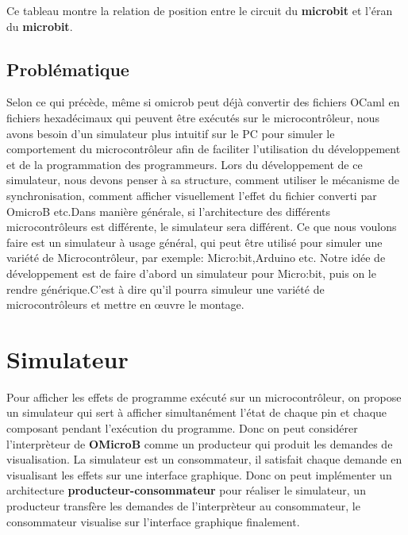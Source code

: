 \documentclass[14px]{article}
\begin{document}
Ce tableau montre la relation de position entre le circuit du  \textbf{microbit} et l'éran du \textbf{microbit}.

\begin{figure}

\end{figure}

\clearpage
\subsection{Problématique}
Selon ce qui précède, même si omicrob peut déjà convertir des fichiers OCaml en fichiers hexadécimaux qui peuvent être exécutés sur le microcontrôleur, nous avons besoin d'un simulateur plus intuitif sur le PC pour simuler le comportement du microcontrôleur afin de faciliter l'utilisation du développement et de la programmation des programmeurs. Lors du développement de ce simulateur, nous devons penser à sa structure, comment utiliser le mécanisme de synchronisation, comment afficher visuellement l'effet du fichier converti par OmicroB etc.Dans manière générale, si l'architecture des différents microcontrôleurs est différente, le simulateur sera différent. Ce que nous voulons faire est un simulateur à usage général, qui peut être utilisé pour simuler une variété de Microcontrôleur, par exemple: Micro:bit,Arduino etc. Notre idée de développement est de faire d'abord un simulateur pour Micro:bit, puis on le rendre générique.C'est à dire qu'il pourra simuleur une variété de microcontrôleurs et mettre en œuvre le montage.

\clearpage
\pagestyle{fancy}
\rhead{\thepage}
\fancyfoot{}
\section{Simulateur}
Pour afficher les effets de programme exécuté sur un microcontrôleur, on propose un simulateur qui sert à afficher simultanément l'état de chaque pin et chaque composant pendant l'exécution du programme. Donc on peut considérer l'interprèteur de \textbf{OMicroB} comme un producteur qui produit les demandes de visualisation. La simulateur est un consommateur, il satisfait chaque demande en visualisant les effets sur une interface graphique. Donc on peut implémenter un architecture \textbf{producteur-consommateur} pour réaliser le simulateur, un producteur transfère les demandes de l'interprèteur au consommateur, le consommateur visualise sur l'interface graphique finalement.\\
\end{document}
